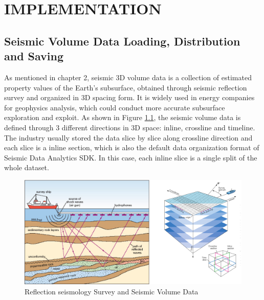 %
%
%

\chapter{\uppercase{Implementation}}

\section{Seismic Volume Data Loading, Distribution and Saving}

As mentioned in chapter 2, seismic 3D volume data is a collection of estimated property values of the Earth's subsurface, obtained through seismic reflection survey and organized in 3D spacing form. It is widely used in energy companies for geophysics analysis, which could conduct more accurate subsurface exploration and exploit. As shown in Figure \ref{seisdata}, the seismic volume data is defined through 3 different directions in 3D space: inline, crossline and timeline. The industry usually stored the data slice by slice along crossline direction and each slice is a inline section, which is also the default data organization format of Seismic Data Analytics SDK. In this case, each inline slice is a single split of the whole dataset.

\begin{figure}[h]
\centering
\includegraphics[scale=0.6]{figures/seisdata.png}
\caption{Reflection seismology Survey and Seismic Volume Data \cite{seisaov} \cite{seisinline}}
\label{seisdata}
\end{figure}

